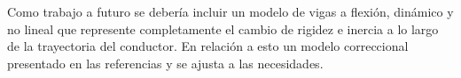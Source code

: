 Como trabajo a futuro se debería incluir un modelo de vigas a flexión,  dinámico y no lineal que represente completamente el cambio de rigidez e inercia a lo largo de la trayectoria del conductor. En relación a esto un modelo correccional presentado en las referencias \cite{Le2014} y \cite{Le2011} se ajusta a las necesidades.
